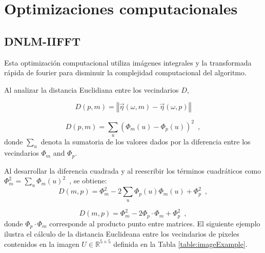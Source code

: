 \section{Optimizaciones computacionales}
\label{ch:marco_opt}

\subsection{DNLM-IIFFT}
\label{ch:marco_dnlmifft}

Esta optimizaci\'on computacional utiliza im\'agenes integrales y la transformada r\'apida de fourier para disminuir la complejidad computacional del algoritmo. 



Al analizar la distancia Euclidiana entre los vecindarios $D$,

\begin{equation}
D\left(p,m\right)=\left\Vert \vec{\eta}\left(\omega,m\right)-\vec{\eta}\left(\omega,p\right)\right\Vert
\end{equation}

\begin{equation}
D\left(p,m\right)=\sum_{u}\left(\varPhi_{m}\left(u\right)-\varPhi_{p}\left(u\right)\right)^{2} \enspace ,
\end{equation}
 donde $\sum_{u}$ denota la sumatoria de los valores dados por la diferencia entre los vecindarios $\varPhi_m$ and $\varPhi_p$.

Al desarrollar la diferencia cuadrada y al reescribir los t\'erminos cuadr\'aticos como $\varPhi_{m}^{2}=\sum_{u}\varPhi_{m}\left(u\right)^{2} \enspace$,  se obtiene: 
\begin{equation}
 D\left(m,p\right)=\varPhi_{m}^{2}-2\sum_{u}\varPhi_{p}\left(u\right)\varPhi_{m}\left(u\right)+\varPhi_{p}^{2}  \enspace ,
 \label{eq_cuadratica}
\end{equation}


\begin{equation}
D\left(m,p\right)=\varPhi_{m}^{2}-2\varPhi_{p}\cdot\varPhi_{m}+\varPhi_{p}^{2} \enspace ,
\end{equation}
donde $\varPhi_{p}\cdot\varPhi_{m}$ corresponde al producto punto entre matrices. El siguiente ejemplo ilustra el c\'alculo de la distancia Euclideana entre los vecindarios de pixeles contenidos en la imagen $U\in\mathbb{R}^{5 \times 5}$ definida en la Tabla \ref{table:imageExample}.








